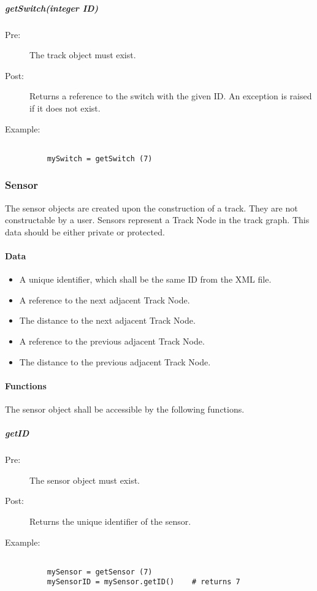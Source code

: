 \documentclass[a4paper,11pt,notitlepage]{article}
\def\TN{Track Node\xspace}
\begin{document}
\subparagraph{getSwitch(integer ID)}
\begin{description}
\item[\hspace{1cm}Pre:] The track object must exist.
\item[\hspace{1cm}Post:] Returns a reference to the switch with the given ID. An exception is raised if it does not exist.
\item[\hspace{1cm}Example:]
\begin{verbatim}

    mySwitch = getSwitch (7)
\end{verbatim}
\end{description}


\subsubsection{Sensor}
The sensor objects are created upon the construction of a track. They are not constructable by a user. Sensors represent a \TN in the track graph. This data should be either private or protected.
\paragraph{Data}
\begin{itemize}
\item A unique identifier, which shall be the same ID from the XML file.
\item A reference to the next adjacent \TN.
\item The distance to the next adjacent \TN.
\item A reference to the previous adjacent \TN.
\item The distance to the previous adjacent \TN.
\end{itemize}
\paragraph{Functions}
The sensor object shall be accessible by the following functions.

\subparagraph{getID}
\begin{description}
\item[\hspace{1cm}Pre:] The sensor object must exist.
\item[\hspace{1cm}Post:] Returns the unique identifier of the sensor.
\item[\hspace{1cm}Example:]
\begin{verbatim}

    mySensor = getSensor (7)
    mySensorID = mySensor.getID()    # returns 7
\end{verbatim}
\end{description}
\end{document}

